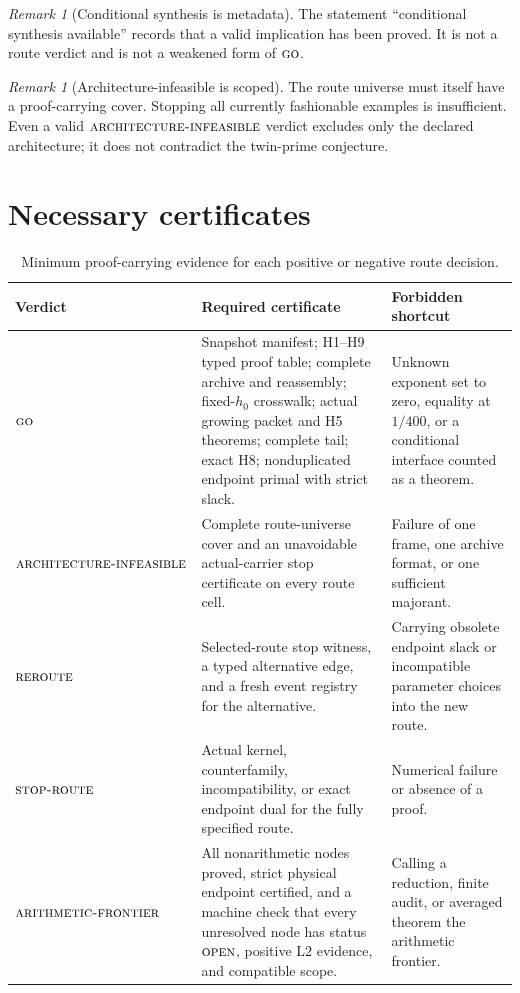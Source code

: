 \documentclass[11pt]{article}
\theoremstyle{definition}
\theoremstyle{remark}
\newtheorem{remark}[theorem]{Remark}
\newcommand{\GO}{\textnormal{\textsc{go}}}
\newcommand{\AINF}{\textnormal{\textsc{architecture-infeasible}}}
\newcommand{\REROUTE}{\textnormal{\textsc{reroute}}}
\newcommand{\STOPR}{\textnormal{\textsc{stop-route}}}
\newcommand{\AF}{\textnormal{\textsc{arithmetic-frontier}}}
\newcommand{\OPEN}{\textnormal{\textsc{open}}}
\newcommand{\Ltwo}{\mathrm{L2}}
\begin{document}
\begin{remark}[Conditional synthesis is metadata]
The statement ``conditional synthesis available'' records that a
valid implication has been proved.  It is not a route verdict and is
not a weakened form of \(\GO\).
\end{remark}

\begin{remark}[Architecture-infeasible is scoped]
The route universe must itself have a proof-carrying cover.  Stopping
all currently fashionable examples is insufficient.  Even a valid
\(\AINF\) verdict excludes only the declared architecture; it does
not contradict the twin-prime conjecture.
\end{remark}

\section{Necessary certificates}

\begin{table}[htbp]
\centering
\scriptsize
\caption{Minimum proof-carrying evidence for each positive or
negative route decision.}
\begin{tabularx}{\textwidth}{@{}P{0.21\textwidth}Y Y@{}}
\toprule
Verdict & Required certificate & Forbidden shortcut\\
\midrule
\(\GO\) &
Snapshot manifest; H1--H9 typed proof table; complete archive and
reassembly; fixed-\(h_0\) crosswalk; actual growing packet and H5
theorems; complete tail; exact H8; nonduplicated endpoint primal with
strict slack. &
Unknown exponent set to zero, equality at \(1/400\), or a conditional
interface counted as a theorem.\\
\(\AINF\) &
Complete route-universe cover and an unavoidable actual-carrier
stop certificate on every route cell. &
Failure of one frame, one archive format, or one sufficient
majorant.\\
\(\REROUTE\) &
Selected-route stop witness, a typed alternative edge, and a fresh
event registry for the alternative. &
Carrying obsolete endpoint slack or incompatible parameter choices
into the new route.\\
\(\STOPR\) &
Actual kernel, counterfamily, incompatibility, or exact endpoint dual
for the fully specified route. &
Numerical failure or absence of a proof.\\
\(\AF\) &
All nonarithmetic nodes proved, strict physical endpoint certified,
and a machine check that every unresolved node has status \(\OPEN\),
positive \(\Ltwo\) evidence, and compatible scope. &
Calling a reduction, finite audit, or averaged theorem the
arithmetic frontier.\\
\bottomrule
\end{tabularx}
\end{table}
\end{document}
